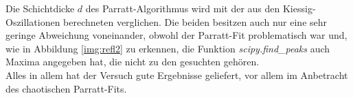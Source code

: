 \noindent
Die Schichtdicke $d$ des Parratt-Algorithmus wird mit der aus den Kiessig-Oszillationen berechneten verglichen. 
Die beiden besitzen auch nur eine sehr geringe Abweichung voneinander, obwohl der Parratt-Fit problematisch war und, 
wie in Abbildung \ref{img:refl2} zu erkennen, die Funktion \textit{scipy.find\_peaks} auch Maxima angegeben hat, die nicht zu den gesuchten gehören.\\
Alles in allem hat der Versuch gute Ergebnisse geliefert, vor allem im Anbetracht des chaotischen Parratt-Fits.
\newpage

